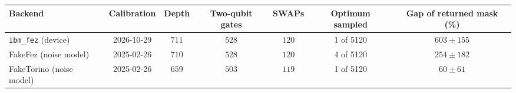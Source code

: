 \begin{tabular}{@{}lcccccc@{}}
\toprule
Backend & Calibration & Depth & Two-qubit gates & SWAPs & Optimum sampled & Gap of returned mask (\%) \\
\midrule
\texttt{ibm\_fez} (device) & 2026-10-29 & \(711\) & \(528\) & \(120\) & 1 of 5120 & \(603\pm155\) \\
FakeFez (noise model) & 2025-02-26 & \(710\) & \(528\) & \(120\) & 4 of 5120 & \(254\pm182\) \\
FakeTorino (noise model) & 2025-02-26 & \(659\) & \(503\) & \(119\) & 1 of 5120 & \(60\pm61\) \\
\bottomrule
\end{tabular}

